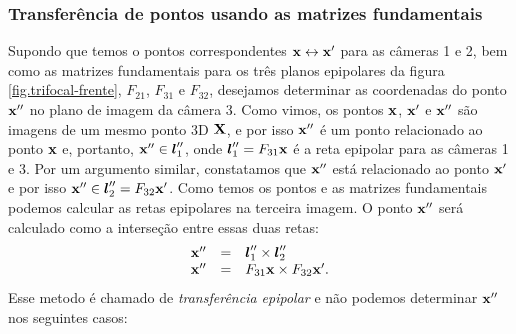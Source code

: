 \subsubsection{Transferência de pontos usando as matrizes fundamentais}
Supondo que temos o pontos correspondentes $\mathbf{x}\leftrightarrow\mathbf{x}'$ para as câmeras 1 e 2, bem como as matrizes fundamentais para os três planos epipolares da figura \ref{fig.trifocal-frente}, $F_{21}$, $F_{31}$ e $F_{32}$, desejamos determinar as coordenadas do ponto $\mathbf{x}''$ no plano de imagem da câmera 3. Como vimos, os pontos $\mathbf{x}$, $\mathbf{x}'$ e $\mathbf{x}''$ são imagens de um mesmo ponto 3D $\mathbf{X}$, e por isso $\mathbf{x}''$ é um ponto relacionado ao ponto $\mathbf{x}$ e, portanto, $\mathbf{x}''\in\boldsymbol{l}''_1$, onde $\boldsymbol{l}''_1=F_{31}\mathbf{x}$ é a reta epipolar para as câmeras 1 e 3. Por um argumento similar, constatamos que $\mathbf{x}''$ está relacionado ao ponto $\mathbf{x}'$ e por isso $\mathbf{x}''\in\boldsymbol{l}''_2=F_{32}\mathbf{x}'$. Como temos os pontos e as matrizes fundamentais podemos calcular as retas epipolares na terceira imagem. O ponto $\mathbf{x}''$ será calculado como a interseção entre essas duas retas:
\begin{equation}
\begin{array}{rcl}
\mathbf{x}''&=&\boldsymbol{l}''_1\times\boldsymbol{l}''_2\\
\mathbf{x}''&=&F_{31}\mathbf{x}\times F_{32}\mathbf{x}'.
\end{array}
\end{equation}
Esse metodo é chamado de {\it transferência epipolar} e não podemos determinar $\mathbf{x}''$ nos seguintes casos:
